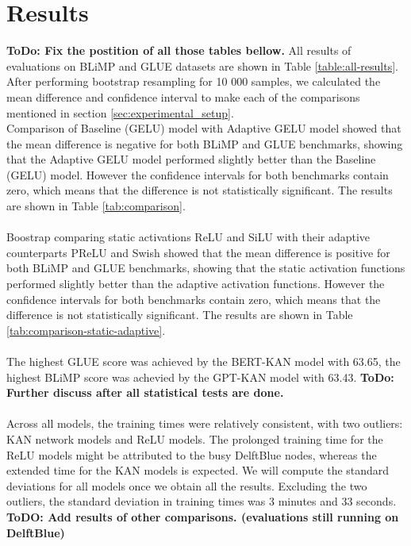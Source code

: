 \section{Results} %
\label{sec:results}
\textbf{ToDo: Fix the postition of all those tables bellow.}
All results of evaluations on BLiMP and GLUE datasets are shown in Table \ref{table:all-results}.\\
After performing bootstrap resampling for 10 000 samples, we calculated the mean difference and confidence interval to make each of the comparisons mentioned in section \ref{sec:experimental_setup}.\\
Comparison of Baseline (GELU) model with Adaptive GELU model showed that the mean difference is negative for both BLiMP and GLUE benchmarks, showing that the Adaptive GELU model performed slightly better than the Baseline (GELU) model. However the confidence intervals for both benchmarks contain zero, which means that the difference is not statistically significant. The results are shown in Table \ref{tab:comparison}.\\\\
Boostrap comparing static activations ReLU and SiLU with their adaptive counterparts PReLU and Swish showed that the mean difference is positive for both BLiMP and GLUE benchmarks, showing that the static activation functions performed slightly better than the adaptive activation functions. However the confidence intervals for both benchmarks contain zero, which means that the difference is not statistically significant. The results are shown in Table \ref{tab:comparison-static-adaptive}.\\\\
The highest GLUE score was achieved by the BERT-KAN model with 63.65, the highest BLiMP score was achevied by the GPT-KAN model with 63.43. \textbf{ToDo: Further discuss after all statistical tests are done.}\\\\
Across all models, the training times were relatively consistent, with two outliers: KAN network models and ReLU models. The prolonged training time for the ReLU models might be attributed to the busy DelftBlue nodes, whereas the extended time for the KAN models is expected. We will compute the standard deviations for all models once we obtain all the results. Excluding the two outliers, the standard deviation in training times was 3 minutes and 33 seconds.
\textbf{ToDO: Add results of other comparisons. (evaluations still running on DelftBlue)}


